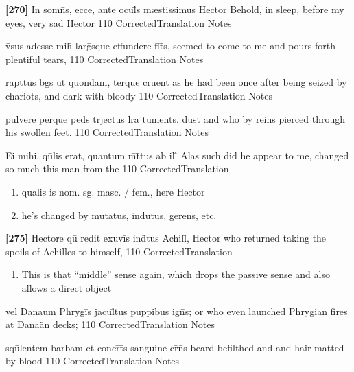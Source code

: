 \latline
  {\textbf{[270]} In somn\={\macron {\i}}s, ecce, ante ocul\={}s m{\ae}stissimus Hector}
  { Behold, in sleep, before my eyes,  very sad Hector   }
  {110}
  { CorrectedTranslation }
  { Notes }


\latline
  {v\={\macron {\i}}sus adesse mih\={\macron {\i}} larg\={}sque effundere fl\={}t\={}s,}
  { seemed to come to me and pours forth plentiful tears, }
  {110}
  { CorrectedTranslation }
  { Notes }

\latline
  {rapt\={}tus b\={\macron {\i}}g\={\macron {\i}}s ut quondam, \={}terque cruent\={}}
  { as he had been once after being seized by chariots, and dark with bloody }
  {110}
  { CorrectedTranslation }
  { Notes }


\latline
  {pulvere perque ped\={}s tr\={}jectus l\={}ra tument\={\macron {\i}}s.}
  { dust and who by reins pierced through his swollen feet. }
  {110}
  { CorrectedTranslation }
  { Notes }


\latline
  {Ei mihi, qu\={}lis erat, quantum m\={}t\={}tus ab ill\={}}
  { Alas such did he appear to me, changed so much this man from  the }
  {110}
  { CorrectedTranslation }
  { \begin{enumerate}
  	\item qualis is nom. sg. masc. / fem., here Hector
  	\item he's changed by mutatus, indutus, gerens, etc.
  \end{enumerate} }


\latline
  {\textbf{[275]} Hectore qu\={\macron {\i}} redit exuvi\={}s ind\={}tus Achill\={\macron {\i}},}
  { Hector who returned taking the spoils of Achilles to himself, }
  {110}
  { CorrectedTranslation }
  { \begin{enumerate}
  	\item This is that ``middle'' sense again, which drops the passive sense and also allows a direct object
  \end{enumerate} }


\latline
  {vel Danaum Phrygi\={}s jacul\={}tus puppibus ign\={\macron {\i}}s;}
  { or who even launched Phrygian fires at Dana\"an decks; }
  {110}
  { CorrectedTranslation }
  { Notes }


\latline
  {squ\={}lentem barbam et concr\={}t\={}s sanguine cr\={\macron {\i}}n\={\macron {\i}}s}
  { beard befilthed and and hair matted by blood }
  {110}
  { CorrectedTranslation }
  { Notes }


